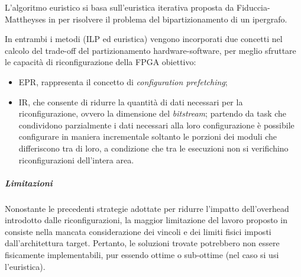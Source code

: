 L'algoritmo euristico si basa sull'euristica iterativa proposta da 
Fiduccia-Mattheyses in \cite{FiducciaMattheyses} per risolvere il problema del 
bipartizionamento di un ipergrafo.

In entrambi i metodi (\ac{ILP} ed euristica) vengono incorporati due concetti 
nel calcolo del trade-off del partizionamento hardware-software, per meglio 
sfruttare le capacità di riconfigurazione della \ac{FPGA} obiettivo:
\begin{itemize}
 \item \ac{EPR}, rappresenta il concetto di \emph{configuration prefetching};
 \item \ac{IR}, che consente di ridurre la quantità di dati necessari per la 
riconfigurazione, ovvero la dimensione del \emph{bitstream}; partendo da task 
che condividono parzialmente i dati necessari alla loro configurazione è 
possibile configurare in maniera incrementale soltanto le porzioni dei 
moduli che differiscono tra di loro, a condizione che tra le esecuzioni non si 
verifichino riconfigurazioni dell'intera area.
\end{itemize}

\subparagraph{Limitazioni}
Nonostante le precedenti strategie adottate per ridurre l'impatto dell'overhead 
introdotto dalle riconfigurazioni, la maggior limitazione del lavoro proposto 
in \cite{JeongHWSWCosynthesis} consiste nella mancata considerazione dei 
vincoli e dei limiti fisici imposti dall'architettura target. Pertanto, le 
soluzioni trovate potrebbero non essere fisicamente implementabili, pur essendo 
ottime o sub-ottime (nel caso si usi l'euristica).






